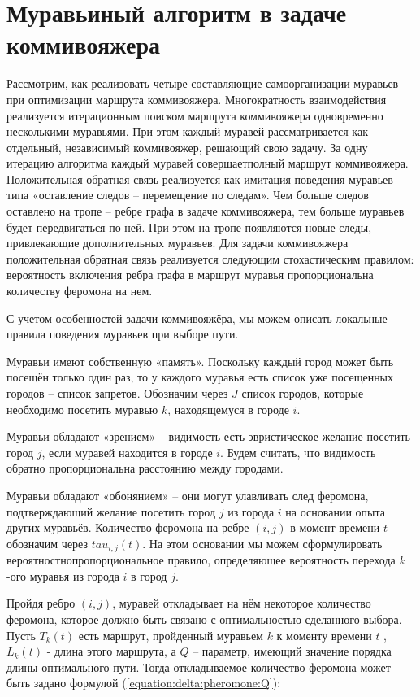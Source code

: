     \section{Муравьиный алгоритм в задаче коммивояжера}
        Рассмотрим, как реализовать четыре составляющие самоорганизации муравьев при оптимизации маршрута коммивояжера.
        Многократность взаимодействия реализуется итерационным поиском маршрута коммивояжера одновременно несколькими муравьями.
        При этом каждый муравей рассматривается как отдельный, независимый коммивояжер, решающий свою задачу. 
        За одну итерацию алгоритма каждый муравей совершаетполный маршрут коммивояжера. 
        Положительная обратная связь реализуется как имитация поведения муравьев 
        типа «оставление следов -- перемещение по следам». 
        Чем больше следов оставлено на тропе -- ребре графа в задаче коммивояжера,
        тем больше муравьев будет передвигаться по ней. 
        При этом на тропе появляются новые следы, привлекающие дополнительных муравьев.
        Для задачи коммивояжера положительная обратная связь реализуется следующим стохастическим правилом: 
        вероятность включения ребра графа в маршрут муравья пропорциональна количеству феромона на нем.
		
        С учетом особенностей задачи коммивояжёра, 
        мы можем описать локальные правила поведения муравьев при выборе пути.

        Муравьи имеют собственную «память».
        Поскольку каждый город может быть посещён только один раз,
        то у каждого муравья есть список уже посещенных городов -- список запретов. 
        Обозначим через $ J $ список городов, 
        которые необходимо посетить муравью $k$,
        находящемуся в городе $i$.
        
        Муравьи обладают «зрением» -- видимость есть эвристическое желание посетить город $j$,
        если муравей находится в городе $i$. 
        Будем считать, что видимость обратно пропорциональна расстоянию между городами.

        Муравьи обладают «обонянием» -- они могут улавливать след феромона,
        подтверждающий желание посетить город $j$ из города $i$ на основании опыта других муравьёв.
        Количество феромона на ребре $(i,j)$ в момент времени $t$ обозначим через $tau_{i,j}(t)$.
        На этом основании мы можем сформулировать вероятностнопропорциональное правило,
        определяющее вероятность перехода $k$-ого муравья из города $i$  в город $j$. 

        Пройдя ребро $(i,j)$, муравей откладывает на нём некоторое количество феромона,
        которое должно быть связано с оптимальностью сделанного выбора.
        Пусть $T_{k}(t)$ есть маршрут, пройденный муравьем $k$ к моменту 
        времени $t$ , $L_{k} (t)$ - длина этого маршрута, 
        а $Q$ -- параметр, имеющий значение порядка длины оптимального пути. 
        Тогда откладываемое количество феромона может быть задано формулой (\ref{equation:delta:pheromone:Q}):

